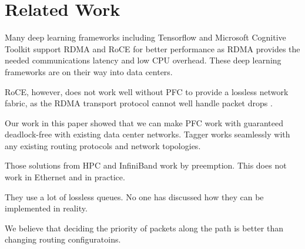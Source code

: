 \section{Related Work}\label{sec:related}

Many deep learning frameworks including Tensorflow \cite{tensorflow} and Microsoft Cognitive Toolkit \cite{cntk} support RDMA and RoCE for better performance as RDMA provides the needed communications latency and low CPU overhead. These deep learning frameworks are on their way into data centers. 

RoCE, however, does not work well without PFC to provide a lossless network fabric, as the RDMA transport protocol cannot well handle packet drops \cite{dcqcn,rdmaatscale}.

Our work in this paper showed that we can make PFC work with guaranteed deadlock-free with existing data center networks. Tagger works seamlessly with any existing routing protocols and network topologies. 

 Those solutions from HPC and InfiniBand
work by preemption. This does not work in Ethernet and in practice.

 They use a lot of lossless queues. No one
has discussed how they can be implemented in reality.

We believe that deciding the priority of packets along the path is better than changing
routing configuratoins.
